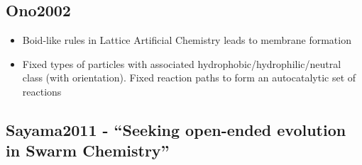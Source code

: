 		\hypertarget{ono2002}{\subsection{Ono2002}\label{ono2002}}
		
		\begin{itemize}
			\item
			
			Boid-like rules in Lattice Artificial Chemistry leads to membrane
			formation
			
			\item
			
			Fixed types of particles with associated
			hydrophobic/hydrophilic/neutral class (with orientation). Fixed
			reaction paths to form an autocatalytic set of reactions
			
		\end{itemize}
		
		\hypertarget{sayama2011---seeking-open-ended-evolution-in-swarm-chemistry}{\subsection{Sayama2011
				- ``Seeking open-ended evolution in Swarm
				Chemistry''}\label{sayama2011---seeking-open-ended-evolution-in-swarm-chemistry}}
		
